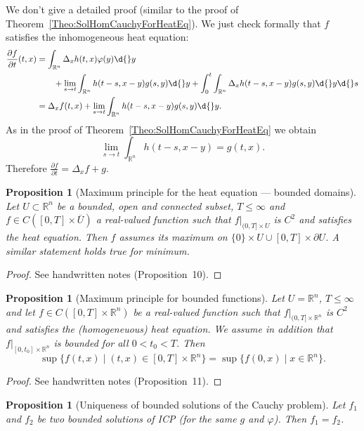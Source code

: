 \documentclass[12pt, oneside, a4paper]{article}
\newtheorem{prop}[thm]{Proposition}
\theoremstyle{dfn}
\def\Rbb{\ensuremath{\mathbb{R}}}
\begin{document}
We don't give a detailed proof (similar to the proof of Theorem~\ref{Theo:SolHomCauchyForHeatEq}). We just check formally that $f$ satisfies the inhomogeneous heat equation:
\begin{align*}
	\frac{\partial f}{\partial t}(t,x)
	&= \int_{\Rbb^n} \Delta_x h(t,x) \varphi(y) \d{}y \\
	& \qquad + \lim_{s \to t} \int_{\Rbb^n} h(t-s,x-y) g(s,y) \d{}y
	+ \int^t_0 \int_{\Rbb^n} \Delta_x h(t-s,x-y) g(s,y) \d{}y \d{}s \\
	&= \Delta_x f(t,x) + \lim_{s \to t} \int_{\Rbb^n} h(t-s,x-y) g(s,y)\d{}y.
\end{align*}
As in the proof of Theorem~\ref{Theo:SolHomCauchyForHeatEq} we obtain
\[
\lim_{s \to t} \int_{\Rbb^n} h(t-s,x-y) = g(t,x).
\]
Therefore $\frac{\partial f}{\partial t} = \Delta_x f + g$.

\begin{prop}[Maximum principle for the heat equation --- bounded domains]%
Let $U \subset \Rbb^n$ be a bounded, open and connected subset, $T \leqslant \infty$ and $f \in C([0,T]\times \overline{U})$ a real-valued function such that $f|_{(0,T] \times U}$ is $C^2$ and satisfies the heat equation. Then $f$ assumes its maximum on $\{0\} \times U \cup [0,T] \times \partial U$. A similar statement holds true for minimum.
\end{prop}

\begin{proof}
See handwritten notes (Proposition~10).
\end{proof}

\begin{prop}[Maximum principle for bounded functions]\label{Prop:HE:MaximalPrincipleBndFcts}
Let $U = \Rbb^n$, $T \leqslant \infty$ and let $f \in C([0,T] \times \Rbb^n)$ be a real-valued function such that $f|_{(0,T] \times \Rbb^n}$ is $C^2$ and satisfies the (homogeneuous) heat equation. We assume in addition that $f|_{[0,t_0] \times \Rbb^n}$ is bounded for all $0 < t_0 < T$. Then
\[
\sup \big\{ f(t,x) \;\big|\; (t,x) \in [0,T] \times \Rbb^n \big \}
= \sup \big\{ f(0,x) \;\big|\; x \in \Rbb^n \big \}.
\]
\end{prop}

\begin{proof}
See handwritten notes (Proposition~11).
\end{proof}

\begin{prop}[Uniqueness of bounded solutions of the Cauchy problem]
Let $f_1$ and $f_2$ be two bounded solutions of ICP (for the same $g$ and $\varphi$). Then $f_1 = f_2$.
\end{prop}
\end{document}
